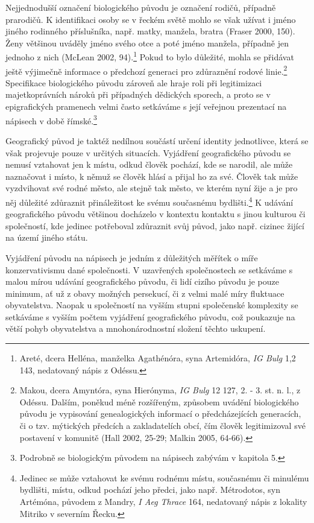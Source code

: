 Nejjednodušší označení biologického původu je označení rodičů, případně prarodičů. K identifikaci osoby se v řeckém světě mohlo se však užívat i jméno jiného rodinného příslušníka, např. matky, manžela, bratra (Fraser 2000, 150). Ženy většinou uváděly jméno svého otce a poté jméno manžela, případně jen jednoho z nich (McLean 2002, 94).\footnote{Areté, dcera Helléna, manželka Agathénóra, syna Artemidóra, {\em IG Bulg} 1,2 143, nedatovaný nápis z Odéssu.} Pokud to bylo důležité, mohla se přidávat ještě výjimečně informace o předchozí generaci pro zdůraznění rodové linie.\footnote{Makou, dcera Amyntóra, syna Hierónyma, {\em IG Bulg} 12 127, 2. - 3. st. n. l., z Odéssu. Dalším, poněkud méně rozšířeným, způsobem uvádění biologického původu je vypisování genealogických informací o předcházejících generacích, či o tzv. mýtických předcích a zakladatelích obcí, čím člověk legitimizoval své postavení v komunitě (Hall 2002, 25-29; Malkin 2005, 64-66).} Specifikace biologického původu zároveň ale hraje roli při legitimizaci majetkoprávních nároků při případných dědických sporech, a proto se v epigrafických pramenech velmi často setkáváme s její veřejnou prezentací na nápisech v době římské.\footnote{Podrobně se biologickým původem na nápisech zabývám v kapitola 5.}

Geografický původ je taktéž nedílnou součástí určení identity jednotlivce, která se však projevuje pouze v určitých situacích. Vyjádření geografického původu se nemusí vztahovat jen k místu, odkud člověk pochází, kde se narodil, ale může naznačovat i místo, k němuž se člověk hlásí a přijal ho za své. Člověk tak může vyzdvihovat své rodné město, ale stejně tak město, ve kterém nyní žije a je pro něj důležité zdůraznit přináležitost ke svému současnému bydlišti.\footnote{Jedinec se může vztahovat ke svému rodnému místu, současnému či minulému bydlišti, místu, odkud pochází jeho předci, jako např. Métrodotos, syn Artémóna, původem z Mandry, {\em I Aeg Thrace} 164, nedatovaný nápis z lokality Mitriko v severním Řecku.} K udávání geografického původu většinou docházelo v kontextu kontaktu s jinou kulturou či společností, kde jedinec potřeboval zdůraznit svůj původ, jako např. cizinec žijící na území jiného státu.

Vyjádření původu na nápisech je jedním z důležitých měřítek o míře konzervativismu dané společnosti. V uzavřených společnostech se setkáváme s malou mírou udávání geografického původu, či lidí cizího původu je pouze minimum, ať už z obavy možných persekucí, či z velmi malé míry fluktuace obyvatelstva. Naopak u společností na vyšším stupni společenské komplexity se setkáváme s vyšším počtem vyjádření geografického původu, což poukazuje na větší pohyb obyvatelstva a mnohonárodnostní složení těchto uskupení.

